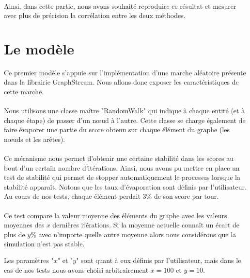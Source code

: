 \documentclass[a4paper, 10pt]{report}
\begin{document}
\paragraph{}Ainsi, dans cette partie, nous avons souhaité reproduire ce résultat et mesurer avec plus de précision la corrélation entre les deux méthodes.

	\section{Le modèle}
		
\paragraph{}Ce premier modèle s'appuie sur l'implémentation d'une marche aléatoire présente dans la librairie GraphStream. Nous allons donc exposer les caractéristiques de cette marche.

\paragraph{}Nous utilisons une classe maître "RandomWalk" qui indique à chaque entité (et à chaque étape) de passer d'un n\oe ud à l'autre. Cette classe se charge également de faire évaporer une partie du score obtenu sur chaque élément du graphe (les n\oe uds et les arêtes). 

\paragraph{}Ce mécanisme nous permet d'obtenir une certaine stabilité dans les scores au bout d'un certain nombre d'itérations. Ainsi, nous avons pu mettre en place un test de stabilité qui permet de stopper automatiquement le processus lorsque la stabilité apparaît. Notons que les taux d'évaporation sont définis par l'utilisateur. Au cours de nos tests, chaque élément perdait 3\% de son score par tour.

\paragraph{}Ce test compare la valeur moyenne des éléments du graphe avec les valeurs moyennes des $x$ dernières itérations. Si la moyenne actuelle connaît un écart de plus de $y$\% avec n'importe quelle autre moyenne alors nous considérons que la simulation n'est pas stable.

Les paramètres "$x$" et "$y$" sont quant à eux définis par l'utilisateur, mais dans le cas de nos tests nous avons choisi arbitrairement $x=100$ et $y=10$.
\end{document}

